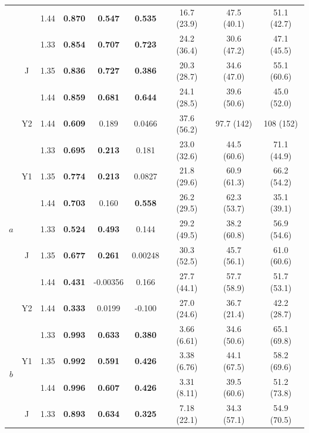 \begin{subappendices}
\begin{table}[htb!]
\begin{tabular}{|ccc|ccc|ccc|}
        & & 1.44 & \textbf{0.870} & \textbf{0.547} & \textbf{0.535} & 16.7 (23.9) & 47.5 (40.1) & 51.1 (42.7)\\
        \cline{2-9}
        & \multirow{3}{*}{J} & 1.33 & \textbf{0.854} & \textbf{0.707} & \textbf{0.723} & 24.2 (36.4) & 30.6 (47.2) & 47.1 (45.5) \\
        & & 1.35 & \textbf{0.836} & \textbf{0.727} & \textbf{0.386} & 20.3 (28.7) & 34.6 (47.0) & 55.1 (60.6) \\
        & & 1.44 & \textbf{0.859} & \textbf{0.681} & \textbf{0.644} & 24.1 (28.5) & 39.6 (50.6) & 45.0 (52.0) \\
        \cline{2-9}
        & Y2 & 1.44 & \textbf{0.609} & 0.189 & 0.0466 & 37.6 (56.2) & 97.7 (142) & 108 (152) \\
        \hline
        \multirow{7}{*}{$a$} & \multirow{3}{*}{Y1} & 1.33 & \textbf{0.695} & \textbf{0.213} & 0.181 & 23.0 (32.6) & 44.5 (60.6) & 71.1 (44.9) \\
        & & 1.35 & \textbf{0.774} & \textbf{0.213} & 0.0827 & 21.8 (29.6) & 60.9 (61.3) & 66.2 (54.2) \\
        & & 1.44 & \textbf{0.703} & 0.160 & \textbf{0.558} & 26.2 (29.5) & 62.3 (53.7) & 35.1 (39.1) \\
        \cline{2-9}
        & \multirow{3}{*}{J} & 1.33 & \textbf{0.524} & \textbf{0.493} & 0.144 & 29.2 (49.5) & 38.2 (60.8) & 56.9 (54.6) \\
        & & 1.35 & \textbf{0.677} & \textbf{0.261} & 0.00248 & 30.3 (52.5) & 45.7 (56.1) & 61.0 (60.6) \\
        & & 1.44 & \textbf{0.431} & -0.00356 & 0.166 & 27.7 (44.1) & 57.7 (58.9) & 51.7 (53.1) \\
        \cline{2-9}
        & Y2 & 1.44 & \textbf{0.333} & 0.0199 & -0.100 & 27.0 (24.6) & 36.7 (21.4) & 42.2 (28.7) \\
        \hline
        \multirow{9}{*}{$b$} & \multirow{3}{*}{Y1} & 1.33 & \textbf{0.993} & \textbf{0.633} & \textbf{0.380} & 3.66 (6.61) & 34.6 (50.6) & 65.1 (69.8) \\
        & & 1.35 & \textbf{0.992} & \textbf{0.591} & \textbf{0.426} & 3.38 (6.76) & 44.1 (67.5) & 58.2 (69.6) \\
        & & 1.44 & \textbf{0.996} & \textbf{0.607} & \textbf{0.426} & 3.31 (8.11) & 39.5 (60.6) & 51.2 (73.8) \\
        \cline{2-9}
        & \multirow{3}{*}{J} & 1.33 & \textbf{0.893} & \textbf{0.634} & \textbf{0.325} & 7.18 (22.1) & 34.3 (57.1) & 54.9 (70.5) \\

\end{tabular}
\end{table}
\end{subappendices}
